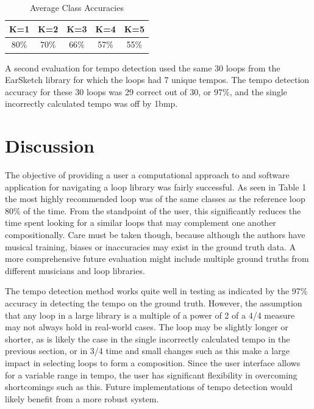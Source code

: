 \documentclass{article}
\begin{document}
\begin{table}[h!]
\centering
  \begin{center}
    \begin{tabular}{| c | c | c | c | c |}
    \hline
    K=1 & K=2 & K=3 & K=4 & K=5 \\
    \hline
    80\% & 70\% & 66\%  & 57\% & 55\% \\
    \hline
    \end{tabular}
      \caption{Average Class Accuracies}\label{tab:bs_eval}
  \end{center}
\end{table}

A second evaluation for tempo detection used the same 30 loops from the EarSketch library for which the loops had 7 unique tempos. The tempo detection accuracy for these 30 loops was 29 correct out of 30, or 97\%, and the single incorrectly calculated tempo was off by 1bmp.


\section{Discussion}

The objective of providing a user a computational approach to and software application for navigating a loop library was fairly successful. As seen in Table 1 the most highly recommended loop was of the same classes as the reference loop 80\% of the time. From the standpoint of the user, this significantly reduces the time spent looking for a similar loops that may complement one another compositionally. Care must be taken though, because although the authors have musical training, biases or inaccuracies may exist in the ground truth data. A more comprehensive future evaluation might include multiple ground truths from different musicians and loop libraries.

The tempo detection method works quite well in testing as indicated by the 97\% accuracy in detecting the tempo on the ground truth. However, the assumption that any loop in a large library is a multiple of a power of 2 of a 4/4 measure may not always hold in real-world cases. The loop may be slightly longer or shorter, as is likely the case in the single incorrectly calculated tempo in the previous section, or in 3/4 time and small changes such as this make a large impact in selecting loops to form a composition. Since the user interface allows for a variable range in tempo, the user has significant flexibility in overcoming shortcomings such as this. Future implementations of tempo detection would likely benefit from a more robust system.
\end{document}
